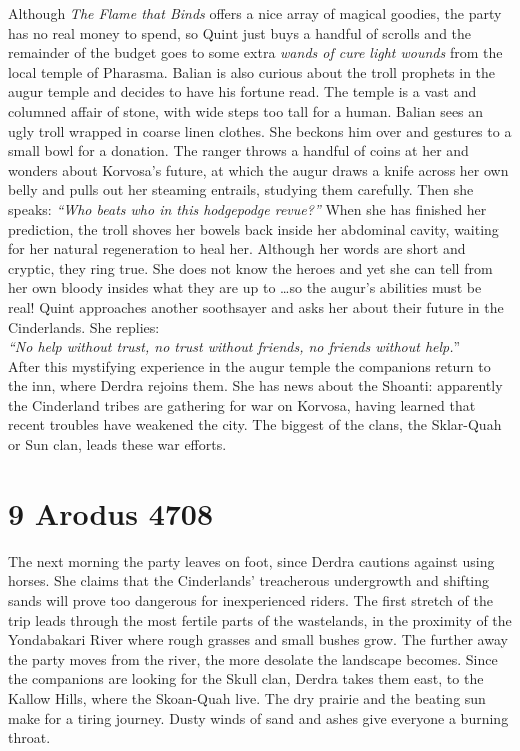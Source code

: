 Although {\itshape The Flame that Binds} offers a nice array of magical goodies, the party has no real money to spend, so Quint just buys a handful of scrolls and the remainder of the budget goes to some extra  {\itshape wands of cure light wounds} from the local temple of Pharasma. Balian is also curious about the troll prophets in the augur temple and decides to have his fortune read. The temple is a vast and columned affair of stone, with wide steps too tall for a human. Balian sees an ugly troll wrapped in coarse linen clothes. She beckons him over and gestures to a small bowl for a donation. The ranger throws a handful of coins at her and wonders about Korvosa's future, at which the augur draws a knife across her own belly and pulls out her steaming entrails, studying them carefully. Then she speaks: {\itshape``Who beats who in this hodgepodge revue?''}   When she has finished her prediction, the troll shoves her bowels back inside her abdominal cavity, waiting for her natural regeneration to heal her. Although her words are short and cryptic, they ring true. She does not know the heroes and yet she can tell from her own bloody insides what they are up to \ldots so the augur's abilities must be real! Quint approaches another soothsayer and asks her about their future in the Cinderlands. She replies:\\

{\itshape``No help without trust, no trust without friends, no friends without help.}''\\

After this mystifying experience in the augur temple the companions return to the inn, where Derdra rejoins them. She has news about the Shoanti: apparently the Cinderland tribes are gathering for war on Korvosa, having learned that recent troubles have weakened the city. The biggest of the clans, the Sklar-Quah or Sun clan, leads these war efforts.\\

\section{9 Arodus 4708}

The next morning the party leaves on foot, since Derdra cautions against using horses. She claims that the Cinderlands' treacherous undergrowth and shifting sands will prove too dangerous for inexperienced riders. The first stretch of the trip leads through the most fertile parts of the wastelands, in the proximity of the Yondabakari River where rough grasses and small bushes grow. The further away the party moves from the river, the more desolate the landscape becomes. Since the companions are looking for the Skull clan, Derdra takes them east, to the Kallow Hills, where the Skoan-Quah live. The dry prairie and the beating sun make for a tiring journey. Dusty winds of sand and ashes give everyone a burning throat.\\

